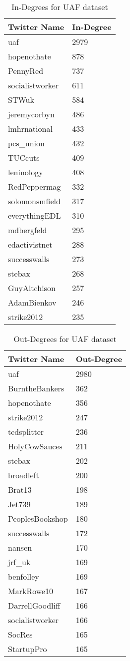 \begin{table}%
\centering
\begin{tabular}{|l|l|}
\hline
Twitter Name & In-Degree \\
\hline
uaf & 2979 \\
hopenothate & 878 \\
PennyRed & 737 \\
socialistworker & 611 \\
STWuk & 584 \\
jeremycorbyn & 486 \\
lmhrnational & 433 \\
pcs\_union & 432 \\
TUCcuts & 409 \\
leninology & 408 \\
RedPeppermag & 332 \\
solomonsmfield & 317 \\
everythingEDL & 310 \\
mdbergfeld & 295 \\
edactivistnet & 288 \\
successwalls & 273 \\
stebax & 268 \\
GuyAitchison & 257 \\
AdamBienkov & 246 \\
strike2012 & 235 \\
\hline
\end{tabular}
\caption{In-Degrees for UAF dataset}
\label{tab:uafin}
\end{table}

\begin{table}%
\centering
\begin{tabular}{|l|l|}
\hline
Twitter Name & Out-Degree \\
\hline
uaf & 2980 \\
BurntheBankers & 362 \\
hopenothate & 356 \\
strike2012 & 247 \\
tedsplitter & 236 \\
HolyCowSauces & 211 \\
stebax & 202 \\
broadleft & 200 \\
Brat13 & 198 \\
Jet739 & 189 \\
PeoplesBookshop & 180 \\
successwalls & 172 \\
nansen & 170 \\
jrf\_uk & 169 \\
benfolley & 169 \\
MarkRowe10 & 167 \\
DarrellGoodliff & 166 \\
socialistworker & 166 \\
SocRes & 165 \\
StartupPro & 165 \\
\hline
\end{tabular}
\caption{Out-Degrees for UAF dataset}
\label{tab:uafout}
\end{table}

